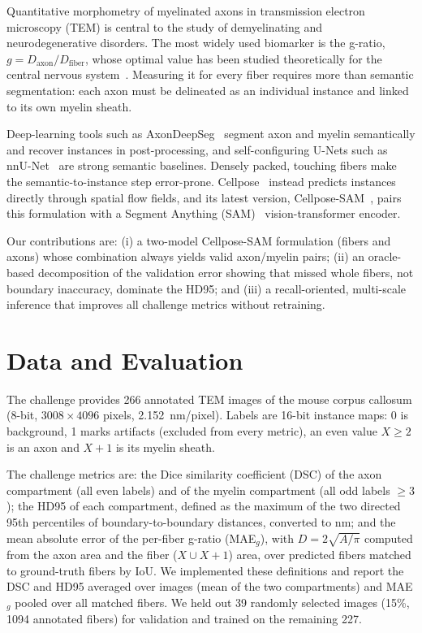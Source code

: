 \documentclass[conference]{IEEEtran}
\begin{document}
Quantitative morphometry of myelinated axons in transmission electron
microscopy (TEM) is central to the study of demyelinating and
neurodegenerative disorders. The most widely used biomarker is the g-ratio,
$g = D_{\text{axon}} / D_{\text{fiber}}$, whose optimal value has been studied
theoretically for the central nervous system~\cite{chomiak2009}. Measuring it
for every fiber requires more than semantic segmentation: each axon must be
delineated as an individual instance and linked to its own myelin sheath.

Deep-learning tools such as AxonDeepSeg~\cite{zaimi2018} segment axon and
myelin semantically and recover instances in post-processing, and
self-configuring U-Nets such as nnU-Net~\cite{isensee2021} are strong semantic
baselines. Densely packed, touching fibers make the semantic-to-instance step
error-prone. Cellpose~\cite{stringer2021} instead predicts instances directly
through spatial flow fields, and its latest version, Cellpose-SAM~\cite{pachitariu2025},
pairs this formulation with a Segment Anything (SAM)~\cite{kirillov2023}
vision-transformer encoder.

Our contributions are: (i) a two-model Cellpose-SAM formulation (fibers and
axons) whose combination always yields valid axon/myelin pairs; (ii) an
oracle-based decomposition of the validation error showing that missed whole
fibers, not boundary inaccuracy, dominate the HD95; and (iii) a recall-oriented,
multi-scale inference that improves all challenge metrics without retraining.

\section{Data and Evaluation}

The challenge provides 266 annotated TEM images of the mouse corpus callosum
(8-bit, $3008\times4096$ pixels, 2.152~nm/pixel). Labels are 16-bit instance
maps: 0 is background, 1 marks artifacts (excluded from every metric), an even
value $X\geq2$ is an axon and $X+1$ is its myelin sheath.

The challenge metrics are: the Dice similarity coefficient (DSC) of the axon
compartment (all even labels) and of the myelin compartment (all odd labels
$\geq3$); the HD95 of each compartment, defined as the maximum of the two
directed 95th percentiles of boundary-to-boundary distances, converted to nm;
and the mean absolute error of the per-fiber g-ratio (MAE$_g$), with
$D = 2\sqrt{A/\pi}$ computed from the axon area and the fiber ($X \cup X+1$)
area, over predicted fibers matched to ground-truth fibers by IoU. We
implemented these definitions and report the DSC and HD95 averaged over images
(mean of the two compartments) and MAE$_g$ pooled over all matched fibers.
We held out 39 randomly selected images (15\%, 1094 annotated fibers) for
validation and trained on the remaining 227.
\end{document}
